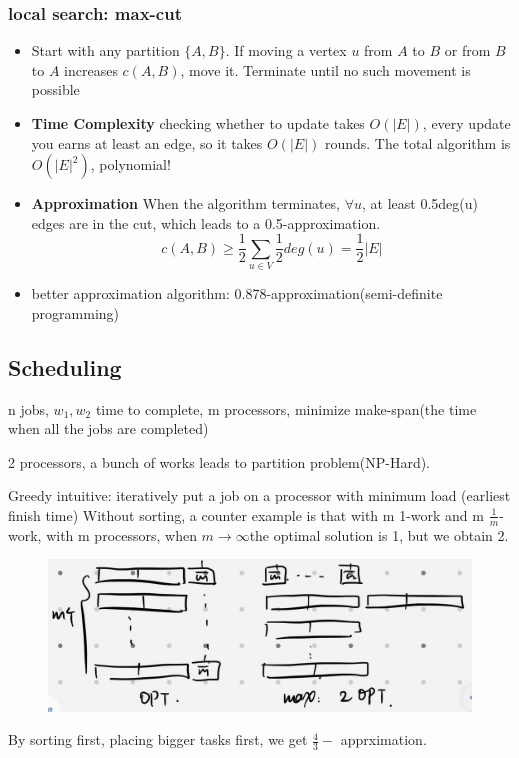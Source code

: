 \subsubsection{local search: max-cut}
\begin{itemize}
    \item  Start with any partition $\{A,B\}$.
If moving a vertex $u$ from $A$ to $B$ or from $B$ to $A$ increases 
$c(A,B)$, move it. Terminate until no such movement is possible
    \item \textbf{Time Complexity} checking whether to update takes $O(|E|)$, every update you earns at least an edge, so it takes $O(|E|)$ rounds. The total algorithm is $O(|E|^2)$, polynomial!
    \item \textbf{Approximation} When the algorithm terminates, $\forall u$, at least 0.5deg(u) edges are in the cut, which leads to a 0.5-approximation.
     \[c(A,B)\geq \frac{1}{2}\sum_{u\in V}\frac{1}{2}deg(u)=\frac{1}{2}|E|\]
    \item better approximation algorithm: 0.878-approximation(semi-definite programming)
\end{itemize}



\subsection*{Scheduling}
n jobs, $w_1,w_2$ time to complete, m processors, minimize make-span(the time when all the jobs are completed)

2 processors, a bunch of works leads to partition problem(NP-Hard).

Greedy intuitive: iteratively put a job on a processor with minimum load (earliest finish time)
Without sorting, a counter example is that with m 1-work and m $\frac{1}{m}$-work, with m processors, when $m \rightarrow \infty $the optimal solution is 1, but we obtain 2. 
\begin{figure}
    \centering
    \includegraphics[width=0.5\linewidth]{Notes/fig/scheduling.jpg}
\end{figure}
By sorting first, placing bigger tasks first, we get $\frac{4}{3}-$ apprximation.